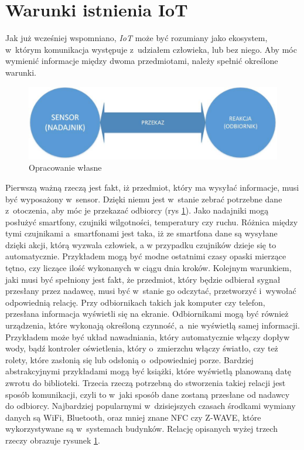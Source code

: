\documentclass{xmgr}
\begin{document}
\section{Warunki istnienia IoT}
	Jak już wcześniej wspomniano, \emph{IoT} może być rozumiany jako ekosystem, w~którym komunikacja występuje z~udziałem człowieka, lub bez niego. Aby móc wymienić informacje między dwoma przedmiotami, należy spełnić określone warunki.
\begin{figure}[h]
\centering
\includegraphics[width=\textwidth]{o}
\caption{Opracowanie własne}
\label{fig:opracowanie}
\end{figure} 
	Pierwszą ważną rzeczą jest fakt, iż przedmiot, który ma wysyłać informacje, musi być wyposażony w~sensor. Dzięki niemu jest w~stanie zebrać potrzebne dane z~otoczenia, aby móc je przekazać odbiorcy (rys \ref{fig:opracowanie}). Jako nadajniki mogą posłużyć smartfony, czujniki wilgotności, temperatury czy ruchu. Różnica między tymi czujnikami a~smartfonami jest taka, iż ze smartfona dane są wysyłane dzięki akcji, którą wyzwala człowiek, a w przypadku czujników dzieje się to automatycznie. Przykładem mogą być modne ostatnimi czasy opaski mierzące tętno, czy liczące ilość wykonanych w ciągu dnia kroków.
	Kolejnym warunkiem, jaki musi być spełniony jest fakt, że przedmiot, który będzie odbierał sygnał przesłany przez nadawcę, musi być w~stanie go odczytać, przetworzyć i~wywołać odpowiednią relację. Przy odbiornikach takich jak komputer czy telefon, przesłana informacja wyświetli się na ekranie. Odbiornikami mogą być również urządzenia, które wykonają określoną czynność, a~nie wyświetlą samej informacji. Przykładem może być układ nawadniania, który automatycznie włączy dopływ wody, bądź kontroler oświetlenia, który o~zmierzchu włączy światło, czy też rolety, które zasłonią się lub odsłonią o~odpowiedniej porze. Bardziej abstrakcyjnymi przykładami mogą być książki, które wyświetlą planowaną datę zwrotu do biblioteki.
	Trzecia rzeczą potrzebną do stworzenia takiej relacji jest sposób komunikacji, czyli to w~jaki sposób dane zostaną przesłane od nadawcy do odbiorcy. Najbardziej popularnymi w~dzisiejszych czasach środkami wymiany danych są WiFi, Bluetooth, oraz mniej znane NFC czy Z-WAVE, które wykorzystywane są w~systemach budynków.  Relację opisanych wyżej trzech rzeczy obrazuje rysunek \ref{fig:opracowanie}.
\end{document}
